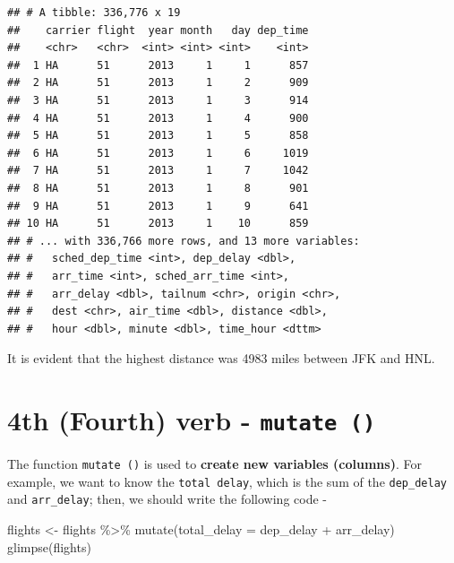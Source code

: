 \documentclass[
]{book}
\newenvironment{Shaded}{\begin{snugshade}}{\end{snugshade}}
\newcommand{\AttributeTok}[1]{\textcolor[rgb]{0.77,0.63,0.00}{#1}}
\newcommand{\FunctionTok}[1]{\textcolor[rgb]{0.00,0.00,0.00}{#1}}
\newcommand{\NormalTok}[1]{#1}
\newcommand{\OtherTok}[1]{\textcolor[rgb]{0.56,0.35,0.01}{#1}}
\newcommand{\SpecialCharTok}[1]{\textcolor[rgb]{0.00,0.00,0.00}{#1}}
\begin{document}
\begin{verbatim}
## # A tibble: 336,776 x 19
##    carrier flight  year month   day dep_time
##    <chr>   <chr>  <int> <int> <int>    <int>
##  1 HA      51      2013     1     1      857
##  2 HA      51      2013     1     2      909
##  3 HA      51      2013     1     3      914
##  4 HA      51      2013     1     4      900
##  5 HA      51      2013     1     5      858
##  6 HA      51      2013     1     6     1019
##  7 HA      51      2013     1     7     1042
##  8 HA      51      2013     1     8      901
##  9 HA      51      2013     1     9      641
## 10 HA      51      2013     1    10      859
## # ... with 336,766 more rows, and 13 more variables:
## #   sched_dep_time <int>, dep_delay <dbl>,
## #   arr_time <int>, sched_arr_time <int>,
## #   arr_delay <dbl>, tailnum <chr>, origin <chr>,
## #   dest <chr>, air_time <dbl>, distance <dbl>,
## #   hour <dbl>, minute <dbl>, time_hour <dttm>
\end{verbatim}

It is evident that the highest distance was 4983 miles between JFK and HNL.

\hypertarget{th-fourth-verb---mutate}{%
\section{\texorpdfstring{4th (Fourth) verb - \texttt{mutate\ ()}}{4th (Fourth) verb - mutate ()}}\label{th-fourth-verb---mutate}}

The function \texttt{mutate\ ()} is used to \textbf{create new variables (columns)}. For example, we want to know the \texttt{total\ delay}, which is the sum of the \texttt{dep\_delay} and \texttt{arr\_delay}; then, we should write the following code -

\begin{Shaded}
\begin{Highlighting}[]
\NormalTok{flights }\OtherTok{\textless{}{-}}\NormalTok{ flights }\SpecialCharTok{\%\textgreater{}\%} 
  \FunctionTok{mutate}\NormalTok{(}\AttributeTok{total\_delay =}\NormalTok{ dep\_delay }\SpecialCharTok{+}\NormalTok{ arr\_delay)}
\FunctionTok{glimpse}\NormalTok{(flights)}
\end{Highlighting}
\end{Shaded}
\end{document}
